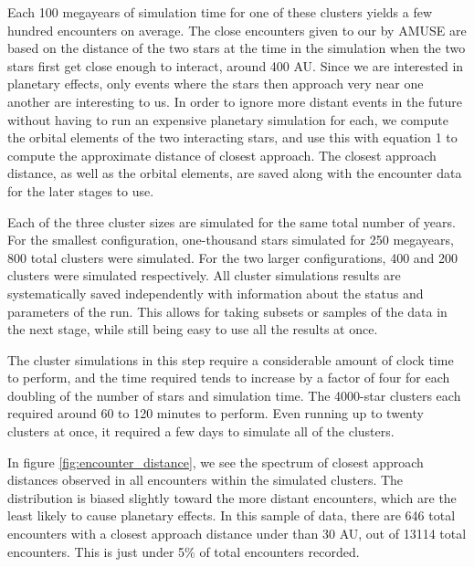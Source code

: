 \documentclass[12pt]{article}
\begin{document}
    Each 100 megayears of simulation time for one of these clusters yields a
    few hundred encounters on average. The close encounters given to our by 
    AMUSE are based on the distance of the two stars at the time in the simulation
    when the two stars first get close enough to interact, around 400 AU.
    Since we are interested in planetary effects, only events where the stars
    then approach very near one another are interesting to us. In order to
    ignore more distant events in the future without having to run an expensive 
    planetary simulation for each, we compute the orbital elements of the two
    interacting stars, and use this with equation 1 to compute the approximate
    distance of closest approach. The closest approach distance, as well as 
    the orbital elements, are saved along with the encounter data for the later
    stages to use.

    Each of the three cluster sizes are simulated for the same total number of years.
    For the smallest configuration, one-thousand stars simulated for 250 megayears, 
    800 total clusters were simulated. For the two larger configurations, 400 and 200
    clusters were simulated respectively. All cluster simulations results are systematically 
    saved independently with information about the status and parameters of the run.
    This allows for taking subsets or samples of the data in the next stage, while still
    being easy to use all the results at once.

    The cluster simulations in this step require a considerable amount of clock time to perform,
    and the time required tends to increase by a factor of four for each doubling of the
    number of stars and simulation time. The 4000-star clusters each required around 60 to 120 minutes
    to perform. Even running up to twenty clusters at once, it required a few days to 
    simulate all of the clusters.

    In figure \ref{fig:encounter_distance}, we see the spectrum of closest approach
    distances observed in all encounters within the simulated clusters. The
    distribution is biased slightly toward the more distant encounters, which
    are the least likely to cause planetary effects. In this sample of data, there are
    646 total encounters with a closest approach distance under than 30 AU, 
    out of 13114 total
    encounters. This is just under 5\% of total encounters recorded.

\end{document}
